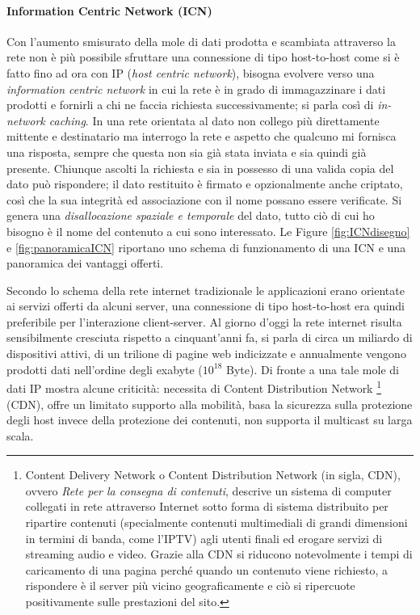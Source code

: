 	\paragraph{Information Centric Network (ICN)}
	Con l'aumento smisurato della mole di dati prodotta e scambiata attraverso la rete non è più possibile sfruttare una connessione di tipo host-to-host come si è fatto fino ad ora con IP (\emph{host centric network}), bisogna evolvere verso una \emph{information centric network} in cui la rete è in grado di immagazzinare i dati prodotti e fornirli a chi ne faccia richiesta successivamente; si parla così di \emph{in-network caching}.
	In una rete orientata al dato non collego più direttamente mittente e destinatario ma interrogo la rete e aspetto che qualcuno mi fornisca una risposta, sempre che questa non sia già stata inviata e sia quindi già presente.
	Chiunque ascolti la richiesta e sia in possesso di una valida copia del dato può rispondere;
	il dato restituito è firmato e opzionalmente anche criptato, così che la sua integrità ed associazione con il nome possano essere verificate.
	Si genera una \emph{disallocazione spaziale e temporale} del dato, tutto ciò di cui ho bisogno è il nome del contenuto a cui sono interessato.
	Le Figure \ref{fig:ICNdisegno} e \ref{fig:panoramicaICN} riportano uno schema di funzionamento di una ICN e una panoramica dei vantaggi offerti.
	
	Secondo lo schema della rete internet tradizionale le applicazioni erano orientate ai servizi offerti da alcuni server, una connessione di tipo host-to-host era quindi preferibile per l'interazione client-server.
	Al giorno d'oggi la rete internet risulta sensibilmente cresciuta rispetto a cinquant'anni fa, si parla di circa un miliardo di dispositivi attivi, di un trilione di pagine web indicizzate e annualmente vengono prodotti dati nell'ordine degli exabyte ($10^{18}$ Byte).
	Di fronte a una tale mole di dati IP mostra alcune criticità: necessita di Content Distribution Network
	\footnote{Content Delivery Network o Content Distribution Network (in sigla, CDN), ovvero \emph{Rete per la consegna di contenuti}, descrive un sistema di computer collegati in rete attraverso Internet sotto forma di sistema distribuito per ripartire contenuti (specialmente contenuti multimediali di grandi dimensioni in termini di banda, come l'IPTV) agli utenti finali ed erogare servizi di streaming audio e video.
	Grazie alla CDN si riducono notevolmente i tempi di caricamento di una pagina perché quando un contenuto viene richiesto, a rispondere è il server più vicino geograficamente e ciò si ripercuote positivamente sulle prestazioni del sito.}
	(CDN), offre un limitato supporto alla mobilità, basa la sicurezza sulla protezione degli host invece della protezione dei contenuti, non supporta il multicast su larga scala.
	
